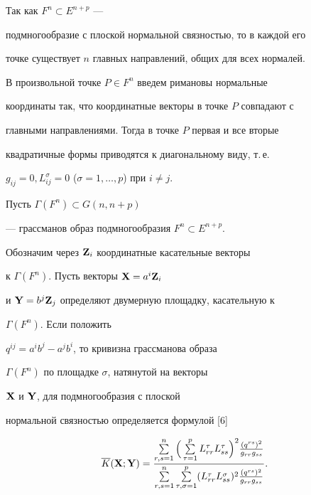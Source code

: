 \begin{pf}


Так как $F^{n}\subset E^{n+p}$ ---


подмногообразие с плоской нормальной связностью, то в каждой его


точке существует $n$ главных направлений, общих для всех нормалей.


В произвольной точке $P\in F^{n}$ введем римановы нормальные


координаты так, что координатные векторы в точке $P$ совпадают с


главными направлениями. Тогда в точке $P$ первая и все вторые


квадратичные формы приводятся к диагональному виду, т.\,е.


$g_{ij}=0, L^{\sigma}_{ij}=0$ ($\sigma =1,\dotsc,p$) при $i\neq j$.


Пусть $\Gamma(F^{n}) \subset G(n,n+p)$


--- грассманов образ подмногообразия $F^{n}\subset E^{n+p}$.


Обозначим через $\bold Z_{i}$ координатные касательные векторы


к $\Gamma(F^{n})$. Пусть векторы $\bold X=a^{i}\bold Z_{i}$


и $\bold{Y}=b^{j}\bold Z_{j}$ определяют двумерную площадку, касательную к


$\Gamma(F^{n})$. Если положить


$q^{ij}=a^{i}b^{j}-a^{j}b^{i}$, то кривизна грассманова образа


$\Gamma(F^{n})$ по площадке $\sigma $, натянутой на векторы


$\bold{X}$ и $\bold{Y}$, для подмногообразия с плоской


нормальной связностью определяется формулой [6]


\begin{equation}


\overline


K(\bold{X};\bold{Y})=\frac{\sum\limits_{r,s=1}^{n}\Big(


\sum\limits_{\tau=1}^{p}L_{rr}^{\tau}L_{ss}^{\tau}


\Big)^{2} \frac{(q^{rs})^{2} }{g_{rr}g_{ss}}}


{\sum\limits_{r,s=1}^{n}\sum\limits_{\tau,\sigma=1}^{p}


(L_{rr}^{\tau}L_{ss}^{\sigma})^{2}\frac{(q^{rs})^{2}}{g_{rr}g_{ss}}}.


\end{equation}






\end{pf}
